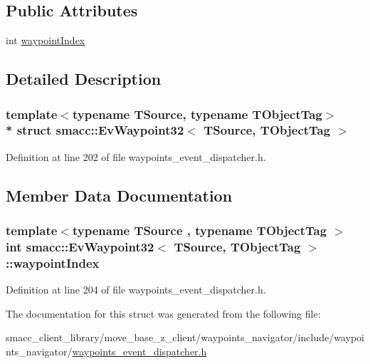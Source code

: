 \subsection*{Public Attributes}
\begin{DoxyCompactItemize}
\item 
int \hyperlink{structsmacc_1_1EvWaypoint32_a50e18144266f1d1dbfc95cb28844aaf5}{waypoint\+Index}
\end{DoxyCompactItemize}


\subsection{Detailed Description}
\subsubsection*{template$<$typename T\+Source, typename T\+Object\+Tag$>$\\*
struct smacc\+::\+Ev\+Waypoint32$<$ T\+Source, T\+Object\+Tag $>$}



Definition at line 202 of file waypoints\+\_\+event\+\_\+dispatcher.\+h.



\subsection{Member Data Documentation}
\subsubsection[{\texorpdfstring{waypoint\+Index}{waypointIndex}}]{\setlength{\rightskip}{0pt plus 5cm}template$<$typename T\+Source , typename T\+Object\+Tag $>$ int {\bf smacc\+::\+Ev\+Waypoint32}$<$ T\+Source, T\+Object\+Tag $>$\+::waypoint\+Index}\hypertarget{structsmacc_1_1EvWaypoint32_a50e18144266f1d1dbfc95cb28844aaf5}{}\label{structsmacc_1_1EvWaypoint32_a50e18144266f1d1dbfc95cb28844aaf5}


Definition at line 204 of file waypoints\+\_\+event\+\_\+dispatcher.\+h.



The documentation for this struct was generated from the following file\+:\begin{DoxyCompactItemize}
\item 
smacc\+\_\+client\+\_\+library/move\+\_\+base\+\_\+z\+\_\+client/waypoints\+\_\+navigator/include/waypoints\+\_\+navigator/\hyperlink{waypoints__event__dispatcher_8h}{waypoints\+\_\+event\+\_\+dispatcher.\+h}\end{DoxyCompactItemize}
